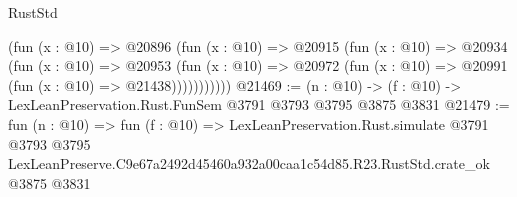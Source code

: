 \begin{lexlean}{RustStd}
\begin{coremodule}
            (fun (x : @10) =>
            @20896
              (fun (x : @10) =>
              @20915
                (fun (x : @10) =>
                @20934
                  (fun (x : @10) =>
                  @20953
                    (fun (x : @10) =>
                    @20972 (fun (x : @10) => @20991 (fun (x : @10) => @21438)))))))))))
@21469 := (n : @10) -> (f : @10) -> LexLeanPreservation.Rust.FunSem @3791 @3793 @3795 @3875 @3831
@21479 := fun (n : @10) =>
  fun (f : @10) =>
  LexLeanPreservation.Rust.simulate
    @3791
    @3793
    @3795
    LexLeanPreserve.C9e67a2492d45460a932a00caa1c54d85.R23.RustStd.crate_ok
    @3875
    @3831
\end{coremodule}
\end{lexlean}
